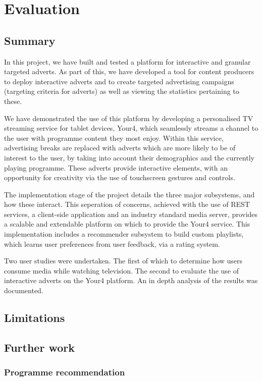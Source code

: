 \section{Evaluation}
	\subsection{Summary}
		In this project, we have built and tested a platform for interactive and granular targeted adverts. As part of this, we have developed a tool for content producers to deploy interactive adverts and to create targeted advertising campaigns (targeting criteria for adverts) as well as viewing the statistics pertaining to these.

		We have demonstrated the use of this platform by developing a personalised TV streaming service for tablet devices, Your4, which seamlessly streams a channel to the user with programme content they most enjoy. Within this service, advertising breaks are replaced with adverts which are more likely to be of interest to the user, by taking into account their demographics and the currently playing programme. These adverts provide interactive elements, with an opportunity for creativity via the use of touchscreen gestures and controls.

		The implementation stage of the project details the three major subsystems, and how these interact. This seperation of concerns, achieved with the use of REST services, a client-side application and an industry standard media server, provides a scalable and extendable platform on which to provide the Your4 service. This implementation includes a recommender subsystem to build custom playlists, which learns user preferences from user feedback, via a rating system.

		Two user studies were undertaken. The first of which to determine how users consume media while watching television. The second to evaluate the use of interactive adverts on the Your4 platform. An in depth analysis of the results was documented.
	\subsection{Limitations}
	\subsection{Further work}
		\subsubsection{Programme recommendation}
		\label{sec:further_work_recommender}

